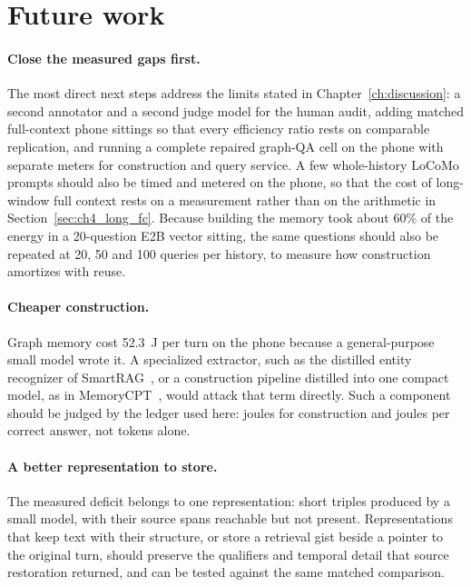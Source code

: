 \section{Future work}
\label{sec:ch10_future_work}

\paragraph{Close the measured gaps first.}
The most direct next steps address the limits stated in Chapter~\ref{ch:discussion}: a second
annotator and a second judge model for the human audit, adding matched full-context phone sittings so that every
efficiency ratio rests on comparable replication, and running a complete repaired graph-QA cell on
the phone with separate meters for construction and query service. A few whole-history LoCoMo
prompts should also be timed and metered on the phone, so that the cost of long-window full context
rests on a measurement rather than on the arithmetic in Section~\ref{sec:ch4_long_fc}. Because building the memory took
about 60\% of the energy in a 20-question E2B vector sitting, the same questions should also be
repeated at 20, 50 and 100 queries per history, to measure how construction amortizes with reuse.

\paragraph{Cheaper construction.}
Graph memory cost 52.3~J per turn on the phone because a general-purpose small model wrote it. A
specialized extractor, such as the distilled entity recognizer of SmartRAG~\citep{smartrag}, or a
construction pipeline distilled into one compact model, as in MemoryCPT~\citep{memorycpt}, would
attack that term directly. Such a component should be judged by the ledger used here: joules for
construction and joules per correct answer, not tokens alone.

\paragraph{A better representation to store.}
The measured deficit belongs to one representation: short triples produced by a small model, with
their source spans reachable but not present. Representations that keep text with their structure,
or store a retrieval gist beside a pointer to the original turn, should preserve the qualifiers and
temporal detail that source restoration returned, and can be tested against the same matched
comparison.

